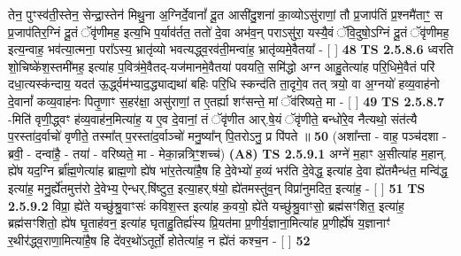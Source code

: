 \documentclass[17pt]{extarticle}
\begin{document}
                  तेन॒ पुꣳस्व॑ती॒स्तेन॒ सेन्द्रा॒स्तेन॑ मिथु॒ना अ॒ग्निर्दे॒वानां᳚ दू॒त आसी॑दु॒शना॑ का॒व्योऽसु॑राणां॒ तौ प्र॒जाप॑तिं प्र॒श्नमै॑ताꣳ॒॒ स प्र॒जाप॑तिर॒ग्निं दू॒तं ॅवृ॑णीमह॒ इत्य॒भि प॒र्याव॑र्तत॒ ततो॑ दे॒वा अभ॑व॒न् पराऽसु॑रा॒ यस्यै॒वं ॅवि॒दुषो॒ऽग्निं दू॒तं ॅवृ॑णीमह॒ इत्य॒न्वाह॒ भव॑त्या॒त्मना॒ परा᳚ऽस्य॒ भ्रातृ॑व्यो भवत्यद्ध्व॒रव॑ती॒मन्वा॑ह॒ भ्रातृ॑व्यमे॒वैतया᳚ - [  ] \textbf{  48} \newline
                  \newline
                                \textbf{ TS 2.5.8.6} \newline
                  ध्वरति शो॒चिष्के॑श॒स्तमी॑मह॒ इत्या॑ह प॒वित्र॑मे॒वैतद्-यज॑मानमे॒वैतया॑ पवयति॒ समि॑द्धो अग्न आहु॒तेत्या॑ह परि॒धिमे॒वैतं परि॑ दधा॒त्यस्क॑न्दाय॒ यदत॑ ऊ॒र्द्ध्वम॑भ्याद॒द्ध्याद्यथा॑ बहिः परि॒धि स्कन्द॑ति ता॒दृगे॒व तत् त्रयो॒ वा अ॒ग्नयो॑ हव्य॒वाह॑नो दे॒वानां᳚ कव्य॒वाह॑नः पितृ॒णाꣳ स॒हर॑क्षा॒ असु॑राणां॒ त ए॒तर्ह्या शꣳ॑सन्ते॒ मां ॅव॑रिष्यते॒ मा - [  ] \textbf{  49} \newline
                  \newline
                                \textbf{ TS 2.5.8.7} \newline
                  -मिति॑ वृणी॒द्ध्वꣳ ह॑व्य॒वाह॑न॒मित्या॑ह॒ य ए॒व दे॒वानां॒ तं ॅवृ॑णीत आर्.षे॒यं ॅवृ॑णीते॒ बन्धो॑रे॒व नैत्यथो॒ संत॑त्यै प॒रस्ता॑द॒र्वाचो॑ वृणीते॒ तस्मा᳚त् प॒रस्ता॑द॒र्वाञ्चो॑ मनु॒ष्या᳚न् पि॒तरोऽनु॒ प्र पि॑पते ॥ \textbf{  50} \newline
                  \newline
                      (अशा᳚न्ता - वाह॒ पञ्च॑दशा - ब्रवी॒ - दन्वा॑है॒ - तया॑ - वरिष्यते॒ मा - मेका॒न्नत्रिꣳ॒॒शच्च॑)  \textbf{(A8)} \newline \newline
                                        \textbf{ TS 2.5.9.1} \newline
                  अग्ने॑ म॒हाꣳ अ॒सीत्या॑ह म॒हान्. ह्ये॑ष यद॒ग्नि र्ब्रा᳚ह्म॒णेत्या॑ह ब्राह्म॒णो ह्ये॑ष भा॑र॒तेत्या॑है॒ष हि दे॒वेभ्यो॑ ह॒व्यं भर॑ति दे॒वेद्ध॒ इत्या॑ह दे॒वा ह्ये॑तमैन्ध॑त॒ मन्वि॑द्ध॒ इत्या॑ह॒ मनु॒र्ह्ये॑तमुत्त॑रो दे॒वेभ्य॒ ऐन्धर्.षि॑ष्टुत॒ इत्या॒हर्.ष॑यो॒ ह्ये॑तमस्तु॑व॒न् विप्रा॑नुमदित॒ इत्या॑ह॒ - [  ] \textbf{  51} \newline
                  \newline
                                \textbf{ TS 2.5.9.2} \newline
                  विप्रा॒ ह्ये॑ते यच्छु॑श्रु॒वाꣳसः॑ कविश॒स्त इत्या॑ह क॒वयो॒ ह्ये॑ते यच्छु॑श्रु॒वाꣳसो॒ ब्रह्म॑सꣳशित॒ इत्या॑ह॒ ब्रह्म॑सꣳशितो॒ ह्ये॑ष घृ॒ताह॑वन॒ इत्या॑ह घृताहु॒तिर्ह्य॑स्य प्रि॒यत॑मा प्र॒णीर्य॒ज्ञाना॒मित्या॑ह प्र॒णीर्ह्ये॑ष य॒ज्ञानाꣳ॑ र॒थीर॑द्ध्व॒राणा॒मित्या॑है॒ष हि दे॑वर॒थो॑ऽतूर्तो॒ होतेत्या॑ह॒ न ह्ये॑तं कश्च॒न - [  ] \textbf{  52} \newline
\end{document}
